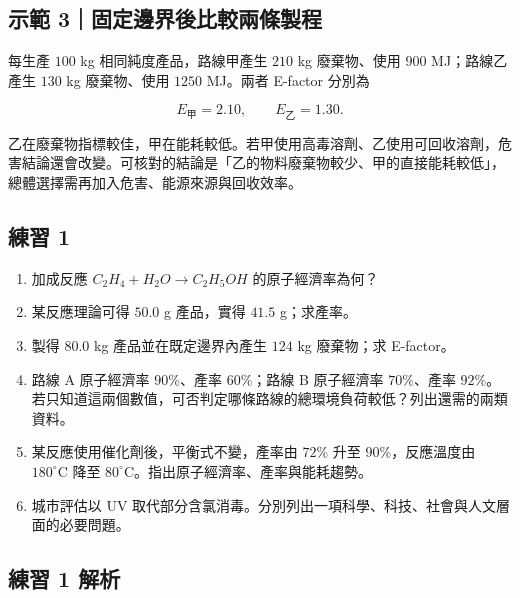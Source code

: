\documentclass[11pt,a4paper]{article}
\providecommand{\tightlist}{%
  \setlength{\itemsep}{0pt}\setlength{\parskip}{0pt}}
\begin{document}
\begin{HandoutWorkedExample}

\subsection{示範 3｜固定邊界後比較兩條製程}\label{ux793aux7bc4-3ux56faux5b9aux908aux754cux5f8cux6bd4ux8f03ux5169ux689dux88fdux7a0b}

每生產 \(100\) kg 相同純度產品，路線甲產生 \(210\) kg 廢棄物、使用 \(900\) MJ；路線乙產生 \(130\) kg 廢棄物、使用 \(1250\) MJ。兩者 E-factor 分別為

\[
E_{\text{甲}}=2.10,\qquad E_{\text{乙}}=1.30.
\]

乙在廢棄物指標較佳，甲在能耗較低。若甲使用高毒溶劑、乙使用可回收溶劑，危害結論還會改變。可核對的結論是「乙的物料廢棄物較少、甲的直接能耗較低」，總體選擇需再加入危害、能源來源與回收效率。

\end{HandoutWorkedExample}

\subsection{練習 1}\label{ux7df4ux7fd2-1}

\begin{enumerate}
\def\labelenumi{\arabic{enumi}.}
\tightlist
\item
  加成反應 \(C_2H_4+H_2O\rightarrow C_2H_5OH\) 的原子經濟率為何？
\item
  某反應理論可得 \(50.0\) g 產品，實得 \(41.5\) g；求產率。
\item
  製得 \(80.0\) kg 產品並在既定邊界內產生 \(124\) kg 廢棄物；求 E-factor。
\item
  路線 A 原子經濟率 \(90\%\)、產率 \(60\%\)；路線 B 原子經濟率 \(70\%\)、產率 \(92\%\)。若只知道這兩個數值，可否判定哪條路線的總環境負荷較低？列出還需的兩類資料。
\item
  某反應使用催化劑後，平衡式不變，產率由 \(72\%\) 升至 \(90\%\)，反應溫度由 \(180^\circ\mathrm C\) 降至 \(80^\circ\mathrm C\)。指出原子經濟率、產率與能耗趨勢。
\item
  城市評估以 UV 取代部分含氯消毒。分別列出一項科學、科技、社會與人文層面的必要問題。
\end{enumerate}

\subsection{練習 1 解析}\label{ux7df4ux7fd2-1-ux89e3ux6790}
\end{document}
